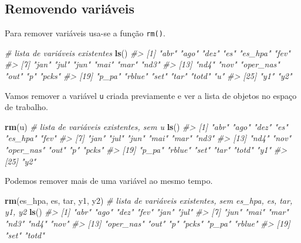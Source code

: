 \documentclass[]{book}
\newenvironment{Shaded}{\begin{snugshade}}{\end{snugshade}}
\newcommand{\KeywordTok}[1]{\textcolor[rgb]{0.13,0.29,0.53}{\textbf{#1}}}
\newcommand{\CommentTok}[1]{\textcolor[rgb]{0.56,0.35,0.01}{\textit{#1}}}
\newcommand{\NormalTok}[1]{#1}
\begin{document}
\subsection{Removendo variáveis}\label{removendo-variaveis}

Para remover variáveis usa-se a função \texttt{rm()}.

\begin{Shaded}
\begin{Highlighting}[]
\CommentTok{# lista de variáveis existentes}
\KeywordTok{ls}\NormalTok{()}
\CommentTok{#>  [1] "abr"      "ago"      "dez"      "es"       "es_hpa"   "fev"     }
\CommentTok{#>  [7] "jan"      "jul"      "jun"      "mai"      "mar"      "nd3"     }
\CommentTok{#> [13] "nd4"      "nov"      "oper_nas" "out"      "p"        "pcks"    }
\CommentTok{#> [19] "p_pa"     "rblue"    "set"      "tar"      "totd"     "u"       }
\CommentTok{#> [25] "y1"       "y2"}
\end{Highlighting}
\end{Shaded}

Vamos remover a variável \texttt{u} criada previamente e ver a lista de
objetos no espaço de trabalho.

\begin{Shaded}
\begin{Highlighting}[]
\KeywordTok{rm}\NormalTok{(u)}
\CommentTok{# lista de variáveis existentes, sem u}
\KeywordTok{ls}\NormalTok{()}
\CommentTok{#>  [1] "abr"      "ago"      "dez"      "es"       "es_hpa"   "fev"     }
\CommentTok{#>  [7] "jan"      "jul"      "jun"      "mai"      "mar"      "nd3"     }
\CommentTok{#> [13] "nd4"      "nov"      "oper_nas" "out"      "p"        "pcks"    }
\CommentTok{#> [19] "p_pa"     "rblue"    "set"      "tar"      "totd"     "y1"      }
\CommentTok{#> [25] "y2"}
\end{Highlighting}
\end{Shaded}

Podemos remover mais de uma variável ao mesmo tempo.

\begin{Shaded}
\begin{Highlighting}[]
\KeywordTok{rm}\NormalTok{(es_hpa, es, tar, y1, y2)}
\CommentTok{# lista de variáveis existentes, sem es_hpa, es, tar, y1, y2}
\KeywordTok{ls}\NormalTok{()}
\CommentTok{#>  [1] "abr"      "ago"      "dez"      "fev"      "jan"      "jul"     }
\CommentTok{#>  [7] "jun"      "mai"      "mar"      "nd3"      "nd4"      "nov"     }
\CommentTok{#> [13] "oper_nas" "out"      "p"        "pcks"     "p_pa"     "rblue"   }
\CommentTok{#> [19] "set"      "totd"}
\end{Highlighting}
\end{Shaded}
\end{document}
